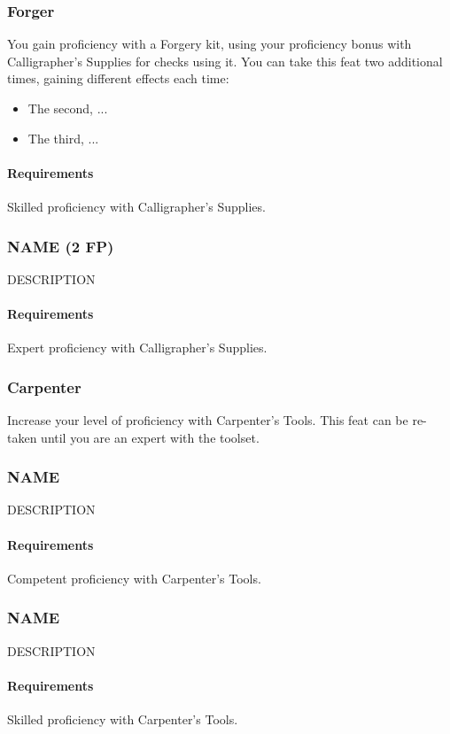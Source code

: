 \subsubsection{Forger} \label{feat::forger}
    You gain proficiency with a Forgery kit, using your proficiency bonus with Calligrapher's Supplies for checks using it.
    You can take this feat two additional times, gaining different effects each time:
    \begin{itemize}
        \item The second, ...
        \item The third, ...
    \end{itemize}
    \paragraph{Requirements} Skilled proficiency with Calligrapher's Supplies.
\subsubsection{NAME (2 FP)} \label{feat::name}
    DESCRIPTION
    \paragraph{Requirements} Expert proficiency with Calligrapher's Supplies.
\subsubsection{Carpenter} \label{feat::carpenter}
    Increase your level of proficiency with Carpenter's Tools.
    This feat can be re-taken until you are an expert with the toolset.
\subsubsection{NAME} \label{feat::name}
    DESCRIPTION
    \paragraph{Requirements} Competent proficiency with Carpenter's Tools.
\subsubsection{NAME} \label{feat::name}
    DESCRIPTION
    \paragraph{Requirements} Skilled proficiency with Carpenter's Tools.
